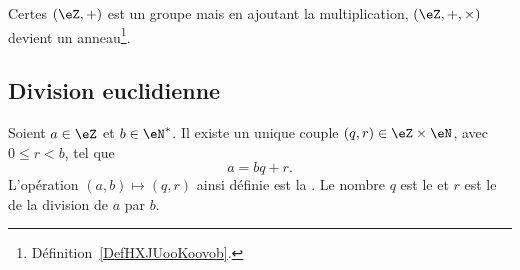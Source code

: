 Certes \( (\eZ,+)\) est un groupe mais en ajoutant la multiplication, \( (\eZ,+,\times)\) devient un anneau\footnote{Définition~\ref{DefHXJUooKoovob}.}.

\subsection{Division euclidienne}

\begin{theoremDef}     \label{ThoDivisEuclide}
	Soient \( a\in\eZ\) et \( b\in\eN^*\). Il existe un unique couple \( (q,r)\in\eZ\times\eN\), avec \( 0\leq r<b\), tel que
	\begin{equation}
		a=bq+r.
	\end{equation}
	L'opération \( (a,b)\mapsto(q,r)\) ainsi définie est la . Le nombre \( q\) est le  et \( r\) est le  de la division de \( a\) par \( b\).
\end{theoremDef}

